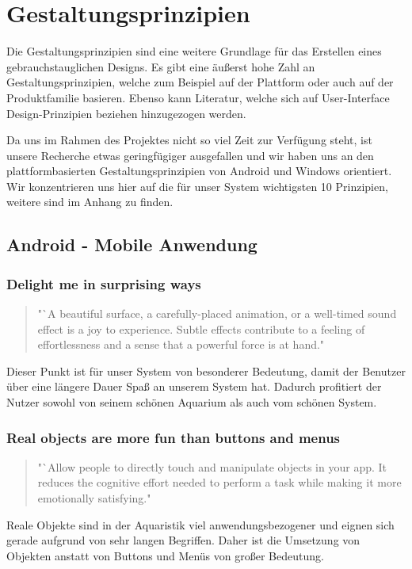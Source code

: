 \chapter{Gestaltungsprinzipien}
Die Gestaltungsprinzipien sind eine weitere Grundlage für das Erstellen eines gebrauchstauglichen Designs. Es gibt eine äußerst hohe Zahl an Gestaltungsprinzipien, welche zum Beispiel auf der Plattform oder auch auf der Produktfamilie basieren. Ebenso kann Literatur, welche sich auf User-Interface Design-Prinzipien beziehen hinzugezogen werden. 

Da uns im Rahmen des Projektes nicht so viel Zeit zur Verfügung steht, ist unsere Recherche etwas geringfügiger ausgefallen und wir haben uns an den plattformbasierten Gestaltungsprinzipien von Android und Windows orientiert. Wir konzentrieren uns hier auf die für unser System wichtigsten 10 Prinzipien, weitere sind im Anhang zu finden.

\section{Android - Mobile Anwendung}

\subsection{Delight me in surprising ways}
\begin{quote} "`A beautiful surface, a carefully-placed animation, or a well-timed sound effect is a joy to experience. Subtle effects contribute to a feeling of effortlessness and a sense that a powerful force is at hand."
\end{quote}

Dieser Punkt ist für unser System von besonderer Bedeutung, damit der Benutzer über eine längere Dauer Spaß an unserem System hat. Dadurch profitiert der Nutzer sowohl von seinem schönen Aquarium als auch vom schönen System.
 
\subsection{Real objects are more fun than buttons and menus}
\begin{quote} "`Allow people to directly touch and manipulate objects in your app. It reduces the cognitive effort needed to perform a task while making it more emotionally satisfying."\end{quote}

Reale Objekte sind in der Aquaristik viel anwendungsbezogener und eignen sich gerade aufgrund von sehr langen Begriffen. Daher ist die Umsetzung von Objekten anstatt von Buttons und Menüs von großer Bedeutung.
 
